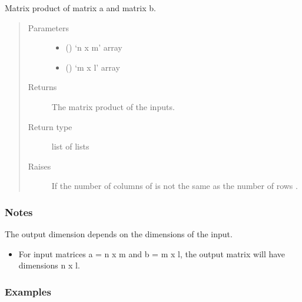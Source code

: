 \documentclass[letterpaper,10pt,english]{sphinxmanual}
\begin{document}
\begin{fulllineitems}
Matrix product of matrix a and  matrix b.
\begin{quote}\begin{description}
\item[{Parameters}] \leavevmode\begin{itemize}
\item {} 
 () \textendash{} ‘n x m’ array

\item {} 
 () \textendash{} ‘m x l’ array

\end{itemize}

\item[{Returns}] \leavevmode
{} \textendash{} The matrix product of the inputs.

\item[{Return type}] \leavevmode
list of lists

\item[{Raises}] \leavevmode
{} \textendash{} If the number of columns of  is not the same as
    the number of rows .

\end{description}\end{quote}
\subsubsection*{Notes}

The output dimension depends on the dimensions of the input.
\begin{itemize}
\item {} 
For input matrices a = n x m and b = m x l, the output matrix will have
dimensions n x l.

\end{itemize}
\subsubsection*{Examples}


\end{fulllineitems}
\end{document}
